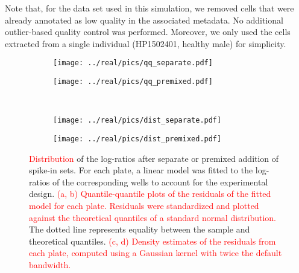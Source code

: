 \documentclass{article}
\newcommand\revised[1]{\textcolor{red}{#1}}
\begin{document}
Note that, for the data set used in this simulation, we removed cells that were already annotated as low quality in the associated metadata.
No additional outlier-based quality control was performed.
Moreover, we only used the cells extracted from a single individual (HP1502401, healthy male) for simplicity.




\newpage
\begin{figure}[btp]
    \begin{center}
        \begin{subfigure}{0.49\textwidth}
            \texttt{[image: ../real/pics/qq\_separate.pdf]}
            \caption{}
        \end{subfigure}
        \begin{subfigure}{0.49\textwidth}
            \texttt{[image: ../real/pics/qq\_premixed.pdf]}
            \caption{}
        \end{subfigure} \\[0.1in]
        \begin{subfigure}{0.49\textwidth}
            \texttt{[image: ../real/pics/dist\_separate.pdf]}
            \caption{}
        \end{subfigure}
        \begin{subfigure}{0.49\textwidth}
            \texttt{[image: ../real/pics/dist\_premixed.pdf]}
            \caption{}
        \end{subfigure}
    \end{center}
    \caption{
        \revised{Distribution} of the log-ratios after separate or premixed addition of spike-in sets.
        For each plate, a linear model was fitted to the log-ratios of the corresponding wells to account for the experimental design.
        \revised{(a, b) Quantile-quantile plots of the residuals of the fitted model for each plate.
        Residuals were standardized and plotted against the theoretical quantiles of a standard normal distribution.}
        The dotted line represents equality between the sample and theoretical quantiles.
        \revised{(c, d) Density estimates of the residuals from each plate, computed using a Gaussian kernel with twice the default bandwidth.}
    }
\end{figure}
\end{document}
